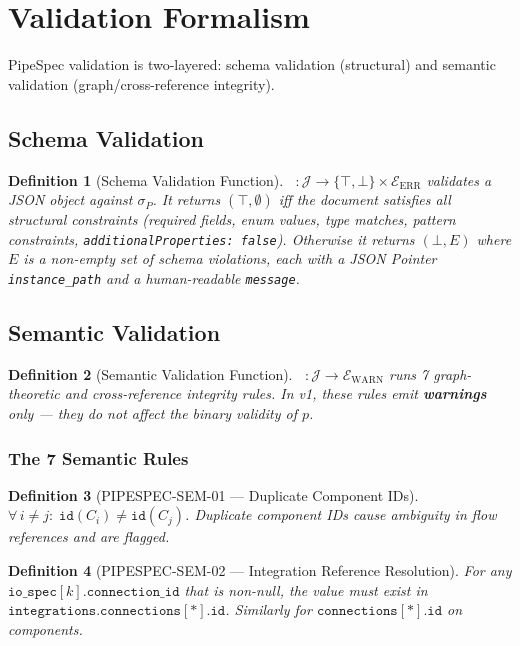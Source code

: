 \documentclass[11pt,a4paper]{article}
\newtheorem{definition}{Definition}[section]
\theoremstyle{definition}
\DeclareMathOperator{\ValidateSchemaP}{\mathcal{V}_S}
\DeclareMathOperator{\ValidateSemanticP}{\mathcal{V}_\Sigma}
\newcommand{\jspace}{\mathcal{J}}
\newcommand{\errs}{\mathcal{E}_{\text{ERR}}}
\newcommand{\warns}{\mathcal{E}_{\text{WARN}}}
\begin{document}
\section{Validation Formalism}

PipeSpec validation is two-layered: schema validation (structural) and semantic validation (graph/cross-reference integrity).

\subsection{Schema Validation}
\begin{definition}[Schema Validation Function]
$\ValidateSchemaP : \jspace \to \{\top, \bot\} \times \errs$ validates a JSON object against $\sigma_P$. It returns $(\top, \emptyset)$ iff the document satisfies all structural constraints (required fields, enum values, type matches, pattern constraints, \texttt{additionalProperties: false}). Otherwise it returns $(\bot, E)$ where $E$ is a non-empty set of schema violations, each with a JSON Pointer \texttt{instance\_path} and a human-readable \texttt{message}.
\end{definition}

\subsection{Semantic Validation}
\begin{definition}[Semantic Validation Function]
$\ValidateSemanticP : \jspace \to \warns$ runs 7 graph-theoretic and cross-reference integrity rules. In v1, these rules emit \textbf{warnings} only — they do not affect the binary validity of $p$.
\end{definition}

\subsubsection{The 7 Semantic Rules}

\begin{definition}[PIPESPEC-SEM-01 — Duplicate Component IDs]
$\forall\, i \neq j:\; \texttt{id}(C_i) \neq \texttt{id}(C_j)$. Duplicate component IDs cause ambiguity in flow references and are flagged.
\end{definition}

\begin{definition}[PIPESPEC-SEM-02 — Integration Reference Resolution]
For any $\texttt{io\_spec}[k].\texttt{connection\_id}$ that is non-null, the value must exist in $\texttt{integrations.connections}[*].\texttt{id}$. Similarly for $\texttt{connections}[*].\texttt{id}$ on components.
\end{definition}
\end{document}
